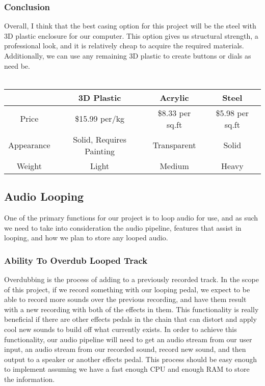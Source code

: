 \documentclass[onecolumn, draftclsnofoot,10pt, compsoc]{IEEEtran}
\begin{document}
        \subsubsection{Conclusion}
        Overall, I think that the best casing option for this project will be the steel with 3D plastic enclosure for our computer. This option gives us structural strength, a professional look, and it is relatively cheap to acquire the required materials. Additionally, we can use any remaining 3D plastic to create buttons or dials as need be.\\
        \\
        \begin{tabular}{c|c|c|c}
             & 3D Plastic & Acrylic & Steel \\
            \hline
            Price & \$15.99 per/kg & \$8.33 per sq.ft & \$5.98 per sq.ft \\
            Appearance & Solid, Requires Painting & Transparent & Solid \\
            Weight & Light & Medium & Heavy\\
            
        \end{tabular}

    \subsection{Audio Looping}
        One of the primary functions for our project is to loop audio for use, and as such we need to take into consideration the audio pipeline, features that assist in looping, and how we plan to store any looped audio.
        
        \subsubsection{Ability To Overdub Looped Track}
        Overdubbing is the process of adding to a previously recorded track. In the scope of this project, if we record something with our looping pedal, we expect to be able to record more sounds over the previous recording, and have them result with a new recording with both of the effects in them. This functionality is really beneficial if there are other effects pedals in the chain that can distort and apply cool new sounds to build off what currently exists. In order to achieve this functionality, our audio pipeline will need to get an audio stream from our user input, an audio stream from our recorded sound, record new sound, and then output to a speaker or another effects pedal. This process should be easy enough to implement assuming we have a fast enough CPU and enough RAM to store the information.
        
\end{document}

